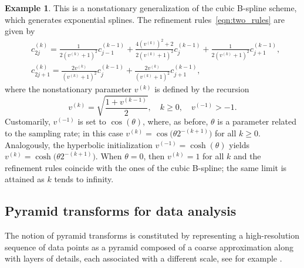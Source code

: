 \documentclass[11pt,a4paper]{article}
\theoremstyle{definition}
\newtheorem{example}[theorem]{Example}
\begin{document}
\begin{example}\label{NS example cubic B-spline}
This is a nonstationary generalization of the cubic B-spline scheme, which generates exponential splines. The refinement rules~\eqref{eqn:two_rules} are given by
\begin{equation}\label{NS cubic B-spline}
\begin{split}
     & c_{2j}^{(k)}=\frac{1}{2(v^{(k)}+1)^2}c_{j-1}^{(k-1)} + \frac{4(v^{(k)})^2+2}{2(v^{(k)}+1)^2}c_j^{(k-1)} + \frac{1}{2(v^{(k)}+1)^2}c_{j+1}^{(k-1)},\\
     & c_{2j+1}^{(k)}=\frac{2v^{(k)}}{(v^{(k)}+1)^2}c_j^{(k-1)} + \frac{2v^{(k)}}{(v^{(k)}+1)^2}c_{j+1}^{(k-1)} ,
\end{split}
\end{equation}
where the nonstationary parameter $v^{(k)}$ is defined by the recursion
\begin{equation}
    v^{(k)}=\sqrt{\frac{1+v^{(k-1)}}{2}}, \quad k \geq 0, \quad v^{(-1)}>-1.
\end{equation}
Customarily, $v^{(-1)}$ is set to $\cos(\theta)$, where, as before, $\theta$ is a parameter related to the sampling rate; in this case $v^{(k)}=\cos\big(\theta 2^{-(k+1)}\big)$ for all $k\geq0$. Analogously, the hyperbolic initialization $v^{(-1)}=\cosh(\theta)$ yields $v^{(k)}=\cosh\big(\theta 2^{-(k+1)}\big)$. When $\theta=0$, then $v^{(k)}=1$ for all $k$ and the refinement rules coincide with the ones of the cubic B-spline; the same limit is attained as $k$ tends to infinity.
\end{example}

\subsection{Pyramid transforms for data analysis}\label{sec:pyramid_transforms}

The notion of pyramid transforms is constituted by representing a high-resolution sequence of data points as a pyramid composed of a coarse approximation along with layers of details, each associated with a different scale, see for example \cite{donoho1992interpolating, dyn2021linear, grohs2010stability, harten1996multiresolution}.
\end{document}
